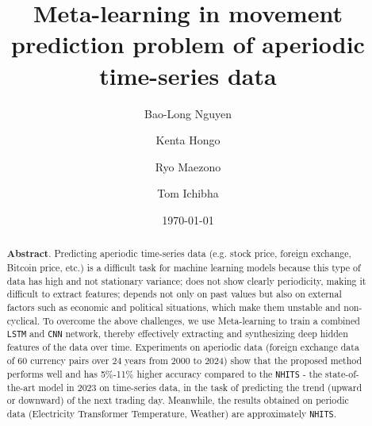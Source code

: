 \documentclass[aps,prb,groupedaddress,twocolumn,showpacs,dvipdfmx,superscriptaddress,pdftex]{revtex4-2}
\begin{document}
\title{
    Meta-learning in movement prediction problem of aperiodic time-series data
}

\author{Bao-Long Nguyen}
%
\author{Kenta Hongo}
%
\author{Ryo Maezono}
%
\author{Tom Ichibha}
%
\date{\today}
\begin{abstract}

    \textbf{Abstract}. Predicting aperiodic time-series data (e.g. stock price, foreign exchange, Bitcoin price, etc.) is a difficult task for machine learning models because this type of data has high and not stationary variance; does not show clearly periodicity, making it difficult to extract features; depends not only on past values but also on external factors such as economic and political situations, which make them unstable and non-cyclical. To overcome the above challenges, we use Meta-learning to train a combined \verb|LSTM| and \verb|CNN| network, thereby effectively extracting and synthesizing deep hidden features of the data over time. Experiments on aperiodic data (foreign exchange data of 60 currency pairs over 24 years from 2000 to 2024) show that the proposed method performs well and has 5\%-11\% higher accuracy compared to the \verb|NHITS| - the state-of-the-art model in 2023 on time-series data, in the task of predicting the trend (upward or downward) of the next trading day. Meanwhile, the results obtained on periodic data (Electricity Transformer Temperature, Weather) are approximately \verb|NHITS|.

\end{abstract}
\maketitle
\end{document}

